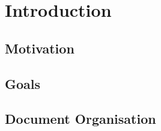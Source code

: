 
\chapter{Introduction}
\label{chapter:introduction}

\section{Motivation}

\section{Goals}

\section{Document Organisation}
